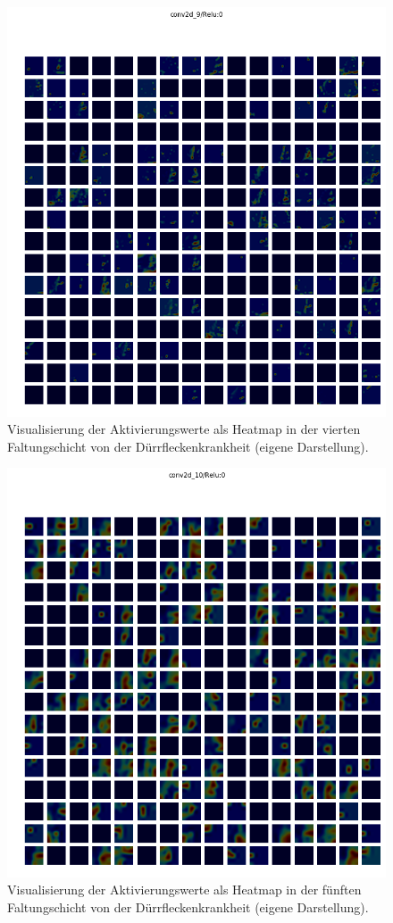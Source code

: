 \begin{figure}[h!]
	\centering
	\includegraphics[width=\textwidth]{visualisierungen/early/heatmap_mit/conv2d_9.png}
	\caption{Visualisierung der Aktivierungswerte als Heatmap in der vierten Faltungschicht von der Dürrfleckenkrankheit (eigene Darstellung).}
	\label{conv2d_9_anhang}
\end{figure}

\begin{figure}[h!]
	\centering
	\includegraphics[width=\textwidth]{visualisierungen/early/heatmap_mit/conv2d_10.png}
	\caption{Visualisierung der Aktivierungswerte als Heatmap in der fünften Faltungschicht von der Dürrfleckenkrankheit (eigene Darstellung).}
	\label{}
\end{figure}